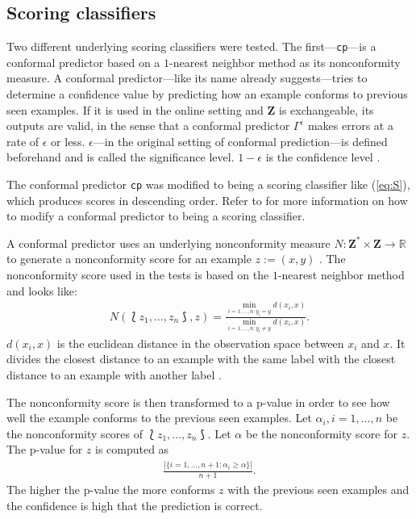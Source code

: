 \documentclass[twoside,11pt]{article}
\def\ds{\Lbag z_1,\dots,z_n \Rbag}
\def\Z{\textbf{Z}}
\begin{document}
\subsection{Scoring classifiers}

Two different underlying scoring classifiers were tested.
The first---\texttt{cp}---is a conformal predictor based
on a $1$-nearest neighbor method as its nonconformity
measure.
A conformal predictor---like its name already
suggests---tries to determine a confidence value by
predicting how an example conforms to previous seen
examples.
If it is used in the online setting and $\Z$ is
exchangeable, its outputs are valid, in the sense that a
conformal predictor $\Gamma^{\epsilon}$ makes errors at
a rate of $\epsilon$ or less.
$\epsilon$---in the original setting of conformal
prediction---is defined beforehand and is called the
significance level. $1-\epsilon$ is the confidence level
\citep[see][]{alrw, fassbender_2019}.

The conformal predictor \texttt{cp} was modified to being a
scoring classifier like (\ref{eq:S}), which produces scores
in descending order.
Refer to \citet{fassbender_2019} for more information on
how to modify a conformal predictor to being a scoring
classifier.

A conformal predictor uses an underlying nonconformity
measure $N:\Z^* \times \Z \rightarrow \mathbb{R}$ to
generate a nonconformity score for an example $z := (x,y)$
\citep[see][]{alrw, fassbender_2019}.
The nonconformity score used in the tests is based on
the $1$-nearest neighbor method and looks like:
\begin{align*}
  N(\ds, z) = \frac{\min_{i=1,\dots,n:y_i=y}d(x_i, x)}
                   {\min_{i=1,\dots,n:y_i\neq y}d(x_i,x)}.
\end{align*}
$d(x_i, x)$ is the euclidean distance in the observation
space between $x_i$ and $x$. It divides the closest
distance to an example with the same label with the
closest distance to an example with another label
\citep[see][]{fassbender_2019}.

The nonconformity score is then transformed to a p-value
in order to see how well the example conforms to the
previous seen examples. Let $\alpha_i, i=1,\dots,n$ be the
nonconformity scores of $\ds$. Let $\alpha$ be the
nonconformity score for $z$. The p-value for $z$ is
computed as
\begin{align*}
  \frac{|\{i=1,\dots,n+1: \alpha_i \geq \alpha\}|}{n + 1}.
\end{align*}
The higher the p-value the more conforms $z$ with the
previous seen examples and the confidence is high that the
prediction is correct.
\end{document}
